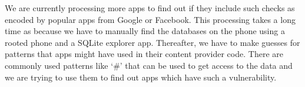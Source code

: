 We are currently processing more apps to find out if they include such checks as encoded by popular apps from Google or Facebook. This processing takes a long time as because we have to manually find the databases on the phone using a rooted phone and a SQLite explorer app. Thereafter, we have to make guesses for patterns that apps might have used in their content provider code. There are commonly used patterns like `\#' that can be used to get access to the data and we are trying to use them to find out apps which have such a vulnerability.